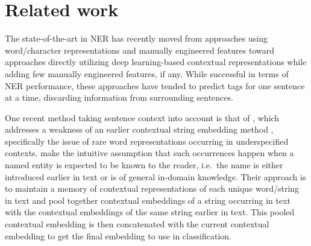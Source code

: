 \documentclass[11pt]{article}
\begin{document}
\section{Related work}

The state-of-the-art in NER has recently moved from approaches using word/character representations and manually engineered features \cite{passos-etal-2014-lexicon,Chiu_2016} toward approaches directly utilizing deep learning-based contextual representations \cite{akbik2018coling,Peters_2018,devlin2018bert,Baevski_2019} while adding few manually engineered features, if any. While successful in terms of NER performance, these approaches have tended to predict tags for one sentence at a time, discarding information from surrounding sentences.

One recent method taking sentence context into account is that of , which addresses a weakness of an earlier contextual string embedding method \cite{akbik2018coling}, specifically the issue of rare word representations occurring in underspecified contexts.  make the intuitive assumption that such occurrences happen when a named entity is expected to be known to the reader, i.e.\ the name is either introduced earlier in text or is of general in-domain knowledge. Their approach is to maintain a memory of contextual representations of each unique word/string in text and pool together contextual embeddings of a string occurring in text with the contextual embeddings of the same string earlier in text. This pooled contextual embedding is then concatenated with the current contextual embedding to get the final embedding to use in classification.
\end{document}
